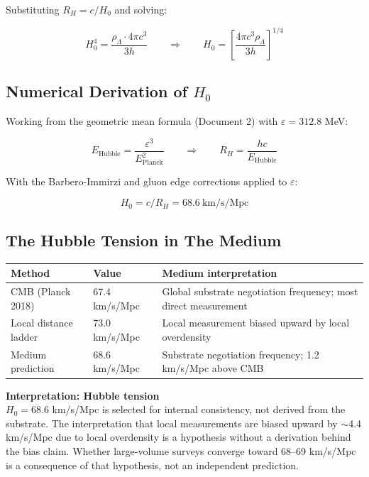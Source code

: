 \documentclass[11pt,letterpaper]{article}
\newenvironment{predbox}{\begin{tcolorbox}[colback=violet!3!white,colframe=violet!50!black,title={\small\textit{Testable prediction}},breakable]}{\end{tcolorbox}}
\begin{document}
Substituting \(R_H = c/H_0\) and solving:

\begin{equation}
\boxed{H_0^4 = \frac{\rho_\Lambda \cdot 4\pi c^3}{3h}} \qquad \Longrightarrow \qquad H_0 = \left[\frac{4\pi c^3 \rho_\Lambda}{3h}\right]^{1/4}
\end{equation}

\subsection{Numerical Derivation of \(H_0\)}
\label{sec:orgbfe0f12}

Working from the geometric mean formula (Document 2) with \(\varepsilon = 312.8\) MeV:

\begin{equation}
E_\text{Hubble} = \frac{\varepsilon^3}{E_\text{Planck}^2} \qquad \Longrightarrow \qquad R_H = \frac{hc}{E_\text{Hubble}}
\end{equation}

With the Barbero-Immirzi and gluon edge corrections applied to \(\varepsilon\):

\begin{equation}
H_0 = c / R_H = 68.6\ \text{km/s/Mpc}
\end{equation}

\subsection{The Hubble Tension in The Medium}
\label{sec:org7013d99}

\begin{center}
\begin{tabular}{lll}
\toprule
\textbf{Method} & \textbf{Value} & \textbf{Medium interpretation}\\[0pt]
\midrule
CMB (Planck 2018) & 67.4 km/s/Mpc & Global substrate negotiation frequency; most direct measurement\\[0pt]
Local distance ladder & 73.0 km/s/Mpc & Local measurement biased upward by local overdensity\\[0pt]
Medium prediction & 68.6 km/s/Mpc & Substrate negotiation frequency; 1.2 km/s/Mpc above CMB\\[0pt]
\bottomrule
\end{tabular}
\end{center}

\begin{predbox}
\textbf{Interpretation: Hubble tension}\\[4pt]
$H_0 = 68.6$ km/s/Mpc is selected for internal consistency, not derived from the substrate. The interpretation that local measurements are biased upward by $\sim$4.4 km/s/Mpc due to local overdensity is a hypothesis without a derivation behind the bias claim. Whether large-volume surveys converge toward 68--69 km/s/Mpc is a consequence of that hypothesis, not an independent prediction.
\end{predbox}
\end{document}
